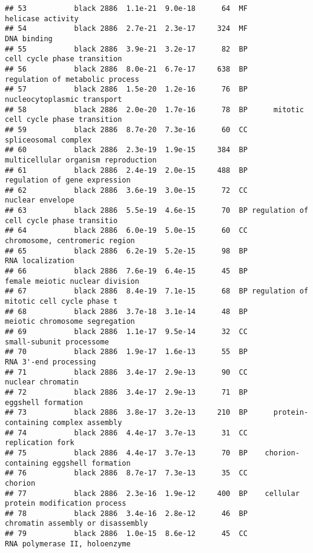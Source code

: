 \documentclass[]{article}
\begin{document}
\begin{verbatim}
## 53           black 2886  1.1e-21  9.0e-18      64  MF                        helicase activity
## 54           black 2886  2.7e-21  2.3e-17     324  MF                              DNA binding
## 55           black 2886  3.9e-21  3.2e-17      82  BP              cell cycle phase transition
## 56           black 2886  8.0e-21  6.7e-17     638  BP          regulation of metabolic process
## 57           black 2886  1.5e-20  1.2e-16      76  BP              nucleocytoplasmic transport
## 58           black 2886  2.0e-20  1.7e-16      78  BP      mitotic cell cycle phase transition
## 59           black 2886  8.7e-20  7.3e-16      60  CC                     spliceosomal complex
## 60           black 2886  2.3e-19  1.9e-15     384  BP      multicellular organism reproduction
## 61           black 2886  2.4e-19  2.0e-15     488  BP            regulation of gene expression
## 62           black 2886  3.6e-19  3.0e-15      72  CC                         nuclear envelope
## 63           black 2886  5.5e-19  4.6e-15      70  BP regulation of cell cycle phase transitio
## 64           black 2886  6.0e-19  5.0e-15      60  CC           chromosome, centromeric region
## 65           black 2886  6.2e-19  5.2e-15      98  BP                         RNA localization
## 66           black 2886  7.6e-19  6.4e-15      45  BP          female meiotic nuclear division
## 67           black 2886  8.4e-19  7.1e-15      68  BP regulation of mitotic cell cycle phase t
## 68           black 2886  3.7e-18  3.1e-14      48  BP           meiotic chromosome segregation
## 69           black 2886  1.1e-17  9.5e-14      32  CC                 small-subunit processome
## 70           black 2886  1.9e-17  1.6e-13      55  BP                    RNA 3'-end processing
## 71           black 2886  3.4e-17  2.9e-13      90  CC                        nuclear chromatin
## 72           black 2886  3.4e-17  2.9e-13      71  BP                       eggshell formation
## 73           black 2886  3.8e-17  3.2e-13     210  BP      protein-containing complex assembly
## 74           black 2886  4.4e-17  3.7e-13      31  CC                         replication fork
## 75           black 2886  4.4e-17  3.7e-13      70  BP    chorion-containing eggshell formation
## 76           black 2886  8.7e-17  7.3e-13      35  CC                                  chorion
## 77           black 2886  2.3e-16  1.9e-12     400  BP    cellular protein modification process
## 78           black 2886  3.4e-16  2.8e-12      46  BP        chromatin assembly or disassembly
## 79           black 2886  1.0e-15  8.6e-12      45  CC            RNA polymerase II, holoenzyme

\end{verbatim}
\end{document}
